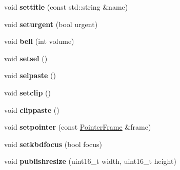 \begin{DoxyCompactItemize}
\mbox{\label{classwlwin_1_1WlWindow_acc28649a9030d37eb4d5690ffe833d95}} 
void {\bfseries settitle} (const std\+::string \&name)
\item 
\mbox{\label{classwlwin_1_1WlWindow_aabbaa5acec8aceb4418d8cb982fa1908}} 
void {\bfseries seturgent} (bool urgent)
\item 
\mbox{\label{classwlwin_1_1WlWindow_aa113e800661404a1d3adf32e517a751f}} 
void {\bfseries bell} (int volume)
\item 
\mbox{\label{classwlwin_1_1WlWindow_a89e854a70361390fdd06dcc500120a4f}} 
void {\bfseries setsel} ()
\item 
\mbox{\label{classwlwin_1_1WlWindow_a27818206aeb9ff659c88bc63d465d08f}} 
void {\bfseries selpaste} ()
\item 
\mbox{\label{classwlwin_1_1WlWindow_a0ff865169651c9a6164978c68757ee48}} 
void {\bfseries setclip} ()
\item 
\mbox{\label{classwlwin_1_1WlWindow_a104d95a840e04f7568ced4a151e1b2a4}} 
void {\bfseries clippaste} ()
\item 
\mbox{\label{classwlwin_1_1WlWindow_a3656eb981b864d70ea9f5246bfd9bfb7}} 
void {\bfseries setpointer} (const \mbox{\hyperlink{structwlwin_1_1PointerFrame}{Pointer\+Frame}} \&frame)
\item 
\mbox{\label{classwlwin_1_1WlWindow_a7d3ca1803fd7d051ee2ebdc772f83d58}} 
void {\bfseries setkbdfocus} (bool focus)
\item 
\mbox{\label{classwlwin_1_1WlWindow_abe7f5ec4e8444ab560712011801b5ec3}} 
void {\bfseries publishresize} (uint16\+\_\+t width, uint16\+\_\+t height)
\end{DoxyCompactItemize}
